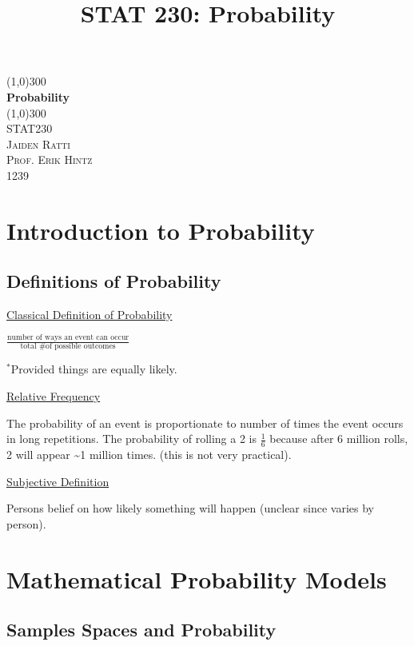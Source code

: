 \documentclass{article}
\title{STAT 230: Probability}
\begin{document}
\begin{titlepage}
	\begin{center}
    \line(1,0){300}\\
    [0.65cm]
	\huge{\bfseries Probability}\\
	\line(1,0){300}\\
	\textsc{\Large STAT230}\\
	\textsc{\Large Jaiden Ratti}\\
        \textsc{\Large Prof. Erik Hintz}\\
    \textsc{\Large 1239}\\
	[5.5cm]
	\end{center}
\end{titlepage}




\tableofcontents

\pagebreak

\section{Introduction to Probability}

\subsection{Definitions of Probability}

\underline{Classical Definition of Probability}

$\frac{\text{number of ways an event can occur}}{\text{total \# of possible outcomes}}$

$^*$Provided things are equally likely.

\underline{Relative Frequency}

The probability of an event is proportionate to number of times the event occurs in long repetitions. The probability of rolling a 2 is $\frac{1}{6}$ because after 6 million rolls, 2 will appear \textasciitilde 1 million times. (this is not very practical). 

\underline{Subjective Definition}

Persons belief on how likely something will happen (unclear since varies by person). 

\section{Mathematical Probability Models}

\subsection{Samples Spaces and Probability}
\end{document}
